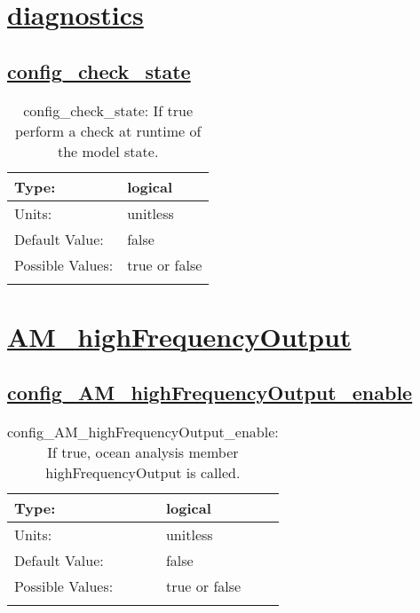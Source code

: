 \section[diagnostics]{\hyperref[sec:nm_tab_diagnostics]{diagnostics}}
\label{sec:nm_sec_diagnostics}
\subsection[config\_check\_state]{\hyperref[sec:nm_tab_diagnostics]{config\_check\_state}}
\label{subsec:nm_sec_config_check_state}
\begin{center}
\begin{longtable}{| p{2.0in} || p{4.0in} |}
    \hline
    Type: & logical \\
    \hline
    Units: & \si{unitless} \\
    \hline
    Default Value: & false \\
    \hline
    Possible Values: & true or false \\
    \hline
    \caption{config\_check\_state: If true perform a check at runtime of the model state.}
\end{longtable}
\end{center}
\section[AM\_highFrequencyOutput]{\hyperref[sec:nm_tab_AM_highFrequencyOutput]{AM\_highFrequencyOutput}}
\label{sec:nm_sec_AM_highFrequencyOutput}
\subsection[config\_AM\_highFrequencyOutput\_enable]{\hyperref[sec:nm_tab_AM_highFrequencyOutput]{config\_AM\_highFrequencyOutput\_enable}}
\label{subsec:nm_sec_config_AM_highFrequencyOutput_enable}
\begin{center}
\begin{longtable}{| p{2.0in} || p{4.0in} |}
    \hline
    Type: & logical \\
    \hline
    Units: & \si{unitless} \\
    \hline
    Default Value: & false \\
    \hline
    Possible Values: & true or false \\
    \hline
    \caption{config\_AM\_highFrequencyOutput\_enable: If true, ocean analysis member highFrequencyOutput is called.}
\end{longtable}
\end{center}
